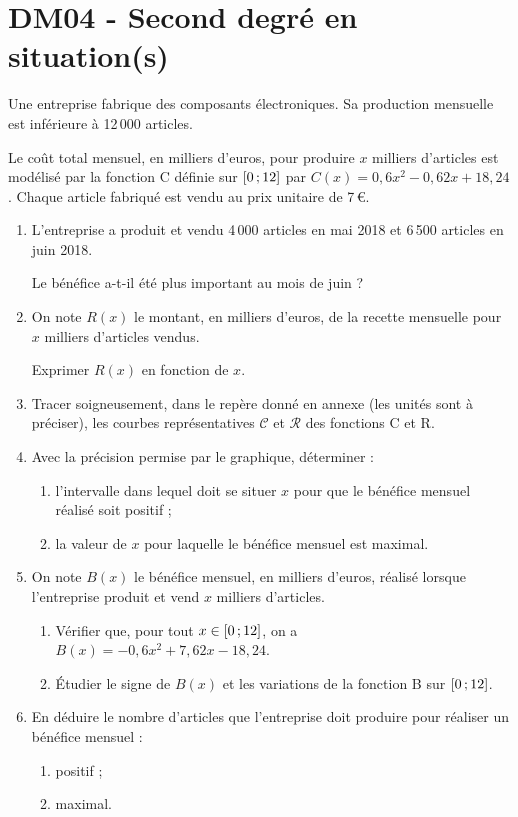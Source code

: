 \documentclass[a4paper,11pt]{article}
\author{Pierquet}
\title{\nomfichier}
\begin{document}
\pagestyle{fancy}

\thispagestyle{entetedm}

\part{DM04 - Second degré en situation(s)}

\smallskip


\medskip

Une entreprise fabrique des composants électroniques. Sa production mensuelle est inférieure à 12\,000 articles.

Le coût total mensuel, en milliers d’euros, pour produire $x$ milliers d’articles est modélisé par la fonction C définie sur $\mbox{\ensuremath{\left[0\mathpunct{};12\right]}}$ par $C(x) = 0,6x^2 - 0,62x + 18,24$. Chaque article fabriqué est vendu au prix unitaire de 7\,€.

\begin{enumerate}
	\item L’entreprise a produit et vendu 4\,000 articles en mai 2018 et 6\,500 articles en juin 2018.
	
	Le bénéfice a-t-il été plus important au mois de juin ?
	\item On note $R(x)$ le montant, en milliers d’euros, de la recette mensuelle pour $x$ milliers d’articles vendus.
	
	Exprimer $R(x)$ en fonction de $x$.
	\item Tracer soigneusement, dans le repère donné en annexe (les unités sont à préciser), les courbes représentatives $\mathscr{C}$ et $\mathscr{R}$ des fonctions C et R. 
	\item Avec la précision permise par le graphique, déterminer :
	\begin{enumerate}
		\item l’intervalle dans lequel doit se situer $x$ pour que le bénéfice mensuel réalisé soit positif ;
		\item la valeur de $x$ pour laquelle le bénéfice mensuel est maximal.
	\end{enumerate}
	\item On note $B(x)$ le bénéfice mensuel, en milliers d’euros, réalisé lorsque l’entreprise produit et vend $x$ milliers d’articles.
	\begin{enumerate}
		\item Vérifier que, pour tout $x \in \mbox{\ensuremath{\left[0\mathpunct{};12\right]}}$, on a $B(x) = -0,6x^2 + 7,62x - 18,24$.
		\item Étudier le signe de $B(x)$ et les variations de la fonction B sur $\mbox{\ensuremath{\left[0\mathpunct{};12\right]}}$.
	\end{enumerate}
	\item En déduire le nombre d’articles que l’entreprise doit produire pour réaliser un bénéfice mensuel :
	\begin{enumerate}
		\item positif ; 
		\item maximal.
	\end{enumerate}
\end{enumerate}
\end{document}
